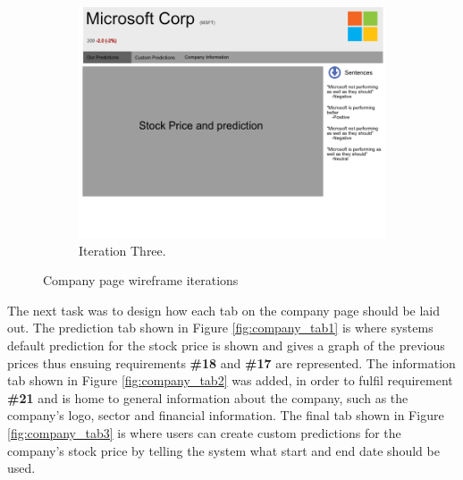 \begin{figure}[!h]
            \hfill
            \begin{subfigure}[b]{0.3\textwidth}
                \includegraphics[width=\textwidth]{images/upload/Company Wireframe 2.png}
                \caption{Iteration Three.}
                \label{fig:company_it3}
            \end{subfigure}
            \caption{Company page wireframe iterations}
            \label{fig:Company_itsss}
        \end{figure}
        
        The next task was to design how each tab on the company page should be laid out. The prediction tab shown in Figure \ref{fig:company_tab1} is where systems default prediction for the stock price is shown and gives a graph of the previous prices thus ensuing requirements \textbf{\#18} and \textbf{\#17} are represented. The information tab shown in Figure \ref{fig:company_tab2} was added, in order to fulfil requirement \textbf{\#21} and is home to general information about the company, such as the company's logo, sector and financial information. The final tab shown in Figure \ref{fig:company_tab3} is where users can create custom predictions for the company's stock price by telling the system what start and end date should be used.
        

